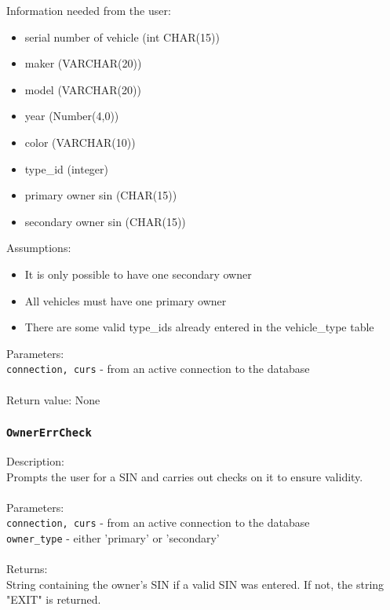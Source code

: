 \documentclass[12pt]{article}
\begin{document}
Information needed from the user:
\begin{itemize}
\item serial number of vehicle (int CHAR(15))
\item maker (VARCHAR(20))
\item model (VARCHAR(20))
\item year (Number(4,0))
\item color (VARCHAR(10))
\item type\_id (integer)
\item primary owner sin (CHAR(15))
\item secondary owner sin (CHAR(15)) 
\end{itemize}

\noindent Assumptions:
\begin{itemize}
\item It is only possible to have one secondary owner
\item All vehicles must have one primary owner
\item There are some valid type\_ids already entered in the 
      vehicle\_type table
\end{itemize}
Parameters:\\
\indent \texttt{connection, curs} - from an active connection to the database\\\\
Return value: None
\subsubsection{\texttt{OwnerErrCheck}}
Description: \\
\indent Prompts the user for a SIN and carries out checks on it to ensure validity.\\\\
\noindent Parameters: \\
\indent\texttt{connection, curs} - from an active connection to the database\\
\indent\texttt{owner\_type} - either 'primary' or 'secondary'\\\\
Returns: \\
\indent String containing the owner's SIN if a valid SIN was entered. If not, the string "EXIT" is returned.
\end{document}
